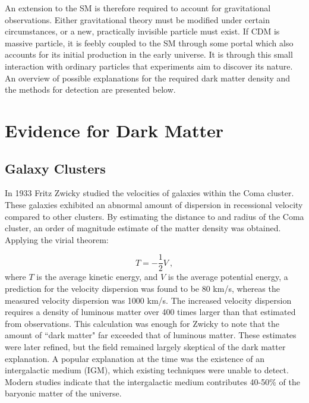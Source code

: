 An extension to the SM is therefore required to account for gravitational observations.
Either gravitational theory must be modified under certain circumstances, or a new, practically invisible particle must exist.
If CDM is massive particle, it is feebly coupled to the SM through some portal which also accounts for its initial production in the early universe.
It is through this small interaction with ordinary particles that experiments aim to discover its nature.
An overview of possible explanations for the required dark matter density and the methods for detection are presented below.

\section{Evidence for Dark Matter}
\subsection{Galaxy Clusters}
In 1933 Fritz Zwicky studied the velocities of galaxies within the Coma cluster.
These galaxies exhibited an abnormal amount of dispersion in recessional velocity compared to other clusters\cite{zwicky_fritz_rotverschiebung_1933}.
By estimating the distance to and radius of the Coma cluster, an order of magnitude estimate of the matter density was obtained.
Applying the virial theorem: 

\begin{equation}
    T = -\frac{1}{2}V~,
    \label{eq:virial}
\end{equation}
\noindent
where $T$ is the average kinetic energy, and $V$ is the average potential energy, a prediction for the velocity dispersion was found to be 80 km/s, whereas the measured velocity dispersion was 1000 km/s.
The increased velocity dispersion requires a density of luminous matter over 400 times larger than that estimated from observations.
This calculation was enough for Zwicky to note that the amount of ``dark matter" far exceeded that of luminous matter.
These estimates were later refined, but the field remained largely skeptical of the dark matter explanation.
A popular explanation at the time was the existence of an intergalactic medium (IGM), which existing techniques were unable to detect.
Modern studies indicate that the intergalactic medium  contributes 40-50\% of the baryonic matter of the universe\cite{bykov_equilibration_2008}.

